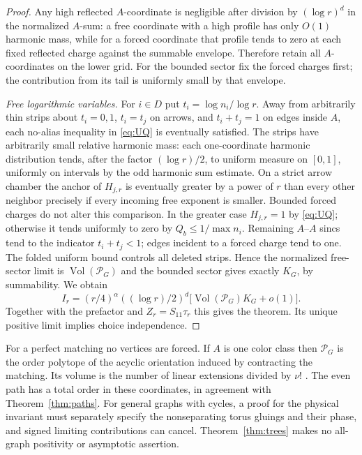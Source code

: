 \begin{proof}
Any high reflected \(A\)-coordinate is negligible after division by \((\log r)^d\) in the normalized \(A\)-sum: a free coordinate with a high profile has only \(O(1)\) harmonic mass, while for a forced coordinate that profile tends to zero at each fixed reflected charge against the summable envelope. Therefore retain all \(A\)-coordinates on the lower grid. For the bounded sector fix the forced charges first; the contribution from its tail is uniformly small by that envelope.

\emph{Free logarithmic variables.}
For \(i\in D\) put \(t_i=\log n_i/\log r\). Away from arbitrarily thin strips about \(t_i=0,1\), \(t_i=t_j\) on arrows, and \(t_i+t_j=1\) on edges inside \(A\), each no-alias inequality in \eqref{eq:UQ} is eventually satisfied. The strips have arbitrarily small relative harmonic mass: each one-coordinate harmonic distribution tends, after the factor \((\log r)/2\), to uniform measure on \([0,1]\), uniformly on intervals by the odd harmonic sum estimate. On a strict arrow chamber the anchor of \(H_{j,r}\) is eventually greater by a power of \(r\) than every other neighbor precisely if every incoming free exponent is smaller. Bounded forced charges do not alter this comparison. In the greater case \(H_{j,r}=1\) by \eqref{eq:UQ}; otherwise it tends uniformly to zero by \(Q_b\le1/\max n_i\). Remaining \(A\)--\(A\) sincs tend to the indicator \(t_i+t_j<1\); edges incident to a forced charge tend to one. The folded uniform bound controls all deleted strips. Hence the normalized free-sector limit is \(\operatorname{Vol}(\mathcal P_G)\) and the bounded sector gives exactly \(K_G\), by summability. We obtain
\[
 I_r=(r/4)^\alpha((\log r)/2)^d
                        \bigl[\operatorname{Vol}(\mathcal P_G)K_G+o(1)\bigr].
\]
Together with the prefactor and \(Z_r=S_{11}\tau_r\) this gives the theorem. Its unique positive limit implies choice independence.
\end{proof}

For a perfect matching no vertices are forced. If \(A\) is one color class then \(\mathcal P_G\) is the order polytope of the acyclic orientation induced by contracting the matching. Its volume is the number of linear extensions divided by \(\nu!\) \cite{Stanley}. The even path has a total order in these coordinates, in agreement with Theorem~\ref{thm:paths}. For general graphs with cycles, a proof for the physical invariant must separately specify the nonseparating torus gluings and their phase, and signed limiting contributions can cancel. Theorem~\ref{thm:trees} makes no all-graph positivity or asymptotic assertion.
